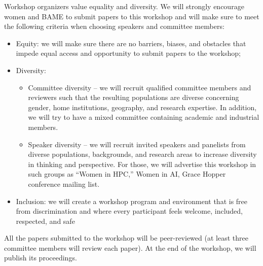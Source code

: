 \documentclass{article}
\begin{document}
Workshop organizers value equality and diversity. We will strongly encourage women and BAME to submit papers to this workshop and will make sure to meet the following criteria when choosing speakers and committee members:
\begin{itemize}
\item Equity: we will make sure there are no barriers, biases, and obstacles that impede equal access and opportunity to submit papers to the workshop;
\item Diversity: 
\begin{itemize}
\item Committee diversity – we will recruit qualified committee members and reviewers such that the resulting populations are diverse concerning gender, home institutions, geography, and research expertise. In addition, we will try to have a mixed committee containing academic and industrial members. 
\item Speaker diversity – we will recruit invited speakers and panelists from diverse populations, backgrounds, and research areas to increase diversity in thinking and perspective. For those, we will advertise this workshop in such groups as “Women in HPC,” Women in AI, Grace Hopper conference mailing list.
\end{itemize}
\item Inclusion: we will create a workshop program and environment that is free from discrimination and where every participant feels welcome, included, respected, and safe
\end{itemize}

All the papers submitted to the workshop will be peer-reviewed  (at least three committee members will review each paper). At the end of the workshop, we will publish its proceedings.
\end{document}
